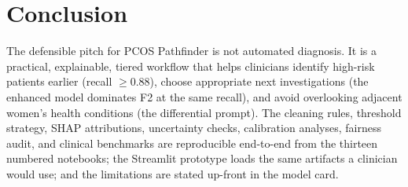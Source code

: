 \documentclass[11pt]{article}
\begin{document}
\section{Conclusion}

The defensible pitch for PCOS Pathfinder is not automated diagnosis. It is a practical, explainable, tiered workflow that helps clinicians identify high-risk patients earlier (recall $\geq 0.88$), choose appropriate next investigations (the enhanced model dominates F2 at the same recall), and avoid overlooking adjacent women's health conditions (the differential prompt). The cleaning rules, threshold strategy, SHAP attributions, uncertainty checks, calibration analyses, fairness audit, and clinical benchmarks are reproducible end-to-end from the thirteen numbered notebooks; the Streamlit prototype loads the same artifacts a clinician would use; and the limitations are stated up-front in the model card.
\end{document}
